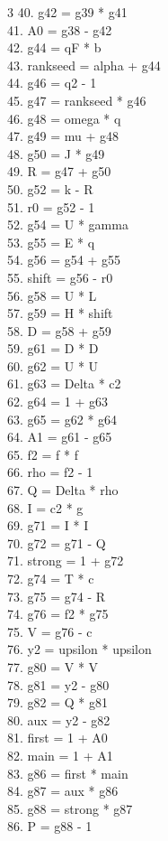 \documentclass[10pt]{article}
\begin{document}
\begin{multicols}{3}
40. g42 = g39 * g41\\
41. A0 = g38 - g42\\
42. g44 = qF * b\\
43. rankseed = alpha + g44\\
44. g46 = q2 - 1\\
45. g47 = rankseed * g46\\
46. g48 = omega * q\\
47. g49 = mu + g48\\
48. g50 = J * g49\\
49. R = g47 + g50\\
50. g52 = k - R\\
51. r0 = g52 - 1\\
52. g54 = U * gamma\\
53. g55 = E * q\\
54. g56 = g54 + g55\\
55. shift = g56 - r0\\
56. g58 = U * L\\
57. g59 = H * shift\\
58. D = g58 + g59\\
59. g61 = D * D\\
60. g62 = U * U\\
61. g63 = Delta * c2\\
62. g64 = 1 + g63\\
63. g65 = g62 * g64\\
64. A1 = g61 - g65\\
65. f2 = f * f\\
66. rho = f2 - 1\\
67. Q = Delta * rho\\
68. I = c2 * g\\
69. g71 = I * I\\
70. g72 = g71 - Q\\
71. strong = 1 + g72\\
72. g74 = T * c\\
73. g75 = g74 - R\\
74. g76 = f2 * g75\\
75. V = g76 - c\\
76. y2 = upsilon * upsilon\\
77. g80 = V * V\\
78. g81 = y2 - g80\\
79. g82 = Q * g81\\
80. aux = y2 - g82\\
81. first = 1 + A0\\
82. main = 1 + A1\\
83. g86 = first * main\\
84. g87 = aux * g86\\
85. g88 = strong * g87\\
86. P = g88 - 1\\
\end{multicols}
\end{document}

